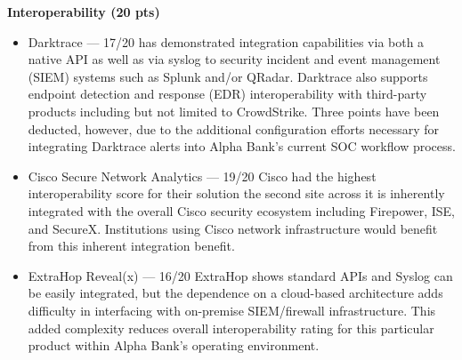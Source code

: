 \documentclass[12pt,a4paper]{report}
\begin{document}
\noindent \textbf{Interoperability (20 pts)}
\begin{itemize}
    \item Darktrace — 17/20 has demonstrated integration capabilities via both a native API as well as via syslog to security incident and event management (SIEM) systems such as Splunk and/or QRadar. Darktrace also supports endpoint detection and response (EDR) interoperability with third-party products including but not limited to CrowdStrike. Three points have been deducted, however, due to the additional configuration efforts necessary for integrating Darktrace alerts into Alpha Bank’s current SOC workflow process.

    \item Cisco Secure Network Analytics — 19/20 Cisco had the highest interoperability score for their solution the second site across it is inherently integrated with the overall Cisco security ecosystem including Firepower, ISE, and SecureX. Institutions using Cisco network infrastructure would benefit from this inherent integration benefit.

    \item ExtraHop Reveal(x) — 16/20 ExtraHop shows standard APIs and Syslog can be easily integrated, but the dependence on a cloud-based architecture adds difficulty in interfacing with on-premise SIEM/firewall infrastructure. This added complexity reduces overall interoperability rating for this particular product within Alpha Bank's operating environment.
\end{itemize}
\end{document}
